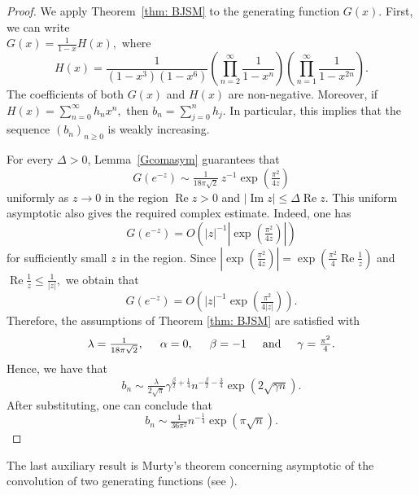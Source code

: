 \documentclass[12pt,a4paper]{amsart}
\numberwithin{equation}{section}
\theoremstyle{plain}
\theoremstyle{definition}
\theoremstyle{remark}
\begin{document}
\begin{proof}
We apply Theorem~\ref{thm: BJSM} to the generating function $G(x)$. First, we can write\\ $G(x)=\frac{1}{1-x}H(x),$
where
$$
H(x)=\frac{1}{(1-x^3)(1-x^6)}
\left(\prod_{n=2}^\infty\frac{1}{1-x^n}\right)
\left(\prod_{n=1}^\infty\frac{1}{1-x^{2n}}\right).
$$
The coefficients of both $G(x)$ and $H(x)$ are non-negative. Moreover, if
$H(x)=\sum_{n=0}^{\infty}h_nx^n,$
then
$b_n=\sum_{j=0}^{n}h_j.
$
In particular, this implies that the sequence $(b_n)_{n\ge0}$ is weakly increasing.

For every $\Delta>0$, Lemma~\ref{Gcomasym} guarantees that
$$
G(e^{-z})
\sim
\tfrac{1}{18\pi\sqrt2}\,
z^{-1}
\exp\left(\tfrac{\pi^2}{4z}\right)
$$
uniformly as $z\to0$ in the region
$
\operatorname{Re}z>0
$
and
$
|\operatorname{Im}z|\le \Delta\operatorname{Re}z.
$
This uniform asymptotic also gives the required complex estimate. Indeed, one has
$$
G(e^{-z})
=
O\!\left(
|z|^{-1}
\left|
\exp\left(\tfrac{\pi^2}{4z}\right)
\right|
\right)
$$
for sufficiently small $z$ in the region. Since
$
\left|
\exp\left(\tfrac{\pi^2}{4z}\right)
\right|
=
\exp\left(
\frac{\pi^2}{4}
\operatorname{Re}\frac{1}{z}
\right)
$
and
$
\operatorname{Re}\frac{1}{z}
\le 
\frac{1}{|z|},
$
we obtain that
$$
G(e^{-z})=
O\left(
|z|^{-1}
\exp\left(\tfrac{\pi^2}{4|z|}\right)\right).
$$
Therefore, the assumptions of Theorem \ref{thm: BJSM} are satisfied with
\begin{align*}
    \lambda=\tfrac{1}{18\pi\sqrt2},\hspace{0.5cm} \alpha=0,\hspace{0.5cm}\beta=-1\hspace{0.5cm}\text{and}\hspace{0.5cm}\gamma=\tfrac{\pi^2}{4}.
\end{align*}
Hence, we have that
$$
b_n
\sim
\tfrac{\lambda}{2\sqrt\pi}
\gamma^{\tfrac{\beta}{2}+\tfrac{1}{4}}
n^{-\tfrac{\beta}{2}-\tfrac{3}{4}}
\exp\left(2\sqrt{\gamma n}\right).
$$
After substituting, one can conclude that
$$
b_n
\sim
\tfrac{1}{36\pi^2}
n^{-\frac{1}{4}}
\exp\left(\pi\sqrt n\right).
$$
\end{proof}

The last auxiliary result is Murty's theorem concerning asymptotic of the convolution of two generating functions (see \cite[Theorem~3]{Murty}).
\end{document}
